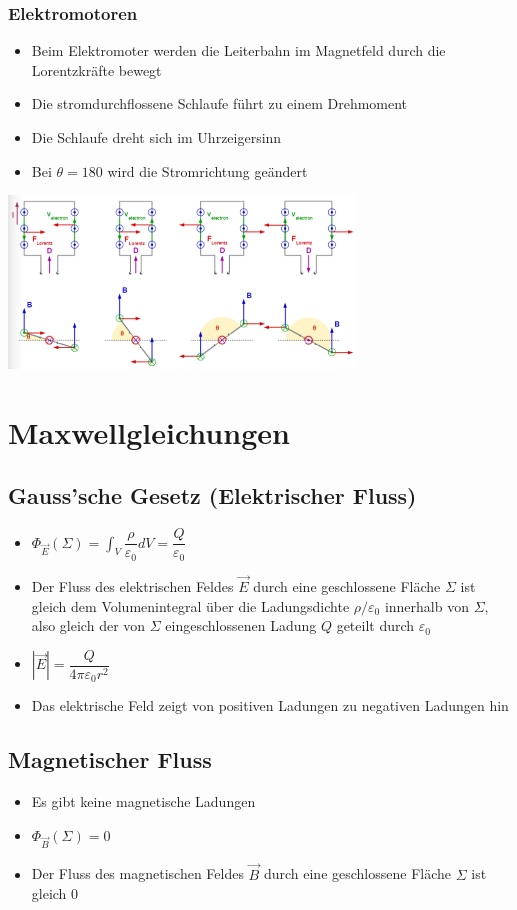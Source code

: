 \documentclass[8pt,a4paper]{scrartcl}
\begin{document}
\begin{multicols*}{3}
					\subsubsection{Elektromotoren}
						\begin{itemize}\itemsep0pt
							\item Beim Elektromoter werden die Leiterbahn im Magnetfeld durch die Lorentzkräfte bewegt
							\item Die stromdurchflossene Schlaufe führt zu einem Drehmoment
							\item Die Schlaufe dreht sich im Uhrzeigersinn
							\item Bei $\theta = 180$ wird die Stromrichtung geändert
						\end{itemize}		
						\includegraphics[height=4.6cm]{img/elemot.png} 
			\section{Maxwellgleichungen}
				\subsection{Gauss’sche Gesetz (Elektrischer Fluss)}
					\begin{itemize}\itemsep0pt
						\item $\Phi_{\overrightarrow{E}}(\Sigma) = \int_{V}\dfrac{\rho}{\varepsilon_{0}}dV = \dfrac{Q}{\varepsilon_{0}}$
						\item Der Fluss des elektrischen Feldes $\overrightarrow{E}$ durch eine geschlossene Fläche $\Sigma$ ist gleich dem Volumenintegral über die Ladungsdichte $\rho / \varepsilon_{0}$ innerhalb von $\Sigma$, also gleich der von $\Sigma$ eingeschlossenen Ladung $Q$ geteilt durch $\varepsilon_{0}$
						\item $|\overrightarrow{E}| = \dfrac{Q}{4\pi\varepsilon_{0}r^{2}}$
						\item Das elektrische Feld zeigt von positiven Ladungen zu negativen Ladungen hin
					\end{itemize}		
				\subsection{Magnetischer Fluss}
					\begin{itemize}\itemsep0pt
						\item Es gibt keine magnetische Ladungen
						\item $\Phi_{\overrightarrow{B}}(\Sigma) =0$
						\item Der Fluss des magnetischen Feldes $\overrightarrow{B}$ durch eine geschlossene Fläche $\Sigma$ ist gleich 0
					\end{itemize}	

\end{multicols*}
\end{document}
